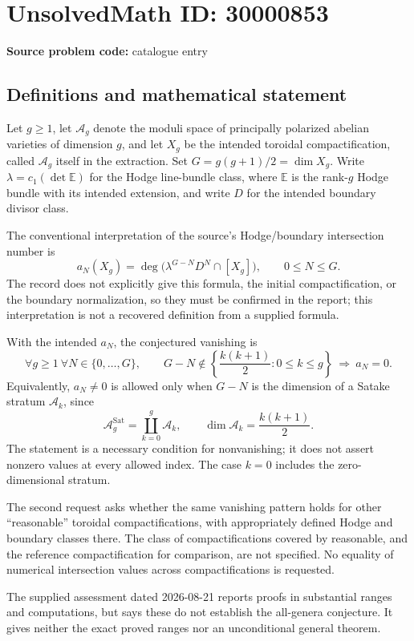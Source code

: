 \documentclass[11pt]{article}
\begin{document}
\section*{UnsolvedMath ID: 30000853}
\textbf{Source problem code:} catalogue entry
\subsection{Definitions and mathematical statement}
Let \(g\geq1\), let \(\mathcal A_g\) denote the moduli space of principally polarized abelian varieties of dimension \(g\), and let \(X_g\) be the intended toroidal compactification, called \(\mathcal A_g\) itself in the extraction. Set \(G=g(g+1)/2=\dim X_g\). Write \(\lambda=c_1(\det\mathbb E)\) for the Hodge line-bundle class, where \(\mathbb E\) is the rank-\(g\) Hodge bundle with its intended extension, and write \(D\) for the intended boundary divisor class.

The conventional interpretation of the source's Hodge/boundary intersection number is
\[
 a_N(X_g)=\deg\bigl(\lambda^{G-N}D^N\cap[X_g]\bigr),
 \qquad 0\leq N\leq G.
\]
The record does not explicitly give this formula, the initial compactification, or the boundary normalization, so they must be confirmed in the report; this interpretation is not a recovered definition from a supplied formula.

With the intended \(a_N\), the conjectured vanishing is
\[
 \forall g\geq1\ \forall N\in\{0,\ldots,G\},\qquad
 G-N\notin\left\{\frac{k(k+1)}2:0\leq k\leq g\right\}
 \ \Longrightarrow\ a_N=0.
\]
Equivalently, \(a_N\ne0\) is allowed only when \(G-N\) is the dimension of a Satake stratum \(\mathcal A_k\), since
\[
 \mathcal A_g^{\mathrm{Sat}}=\coprod_{k=0}^g\mathcal A_k,
 \qquad\dim\mathcal A_k=\frac{k(k+1)}2.
\]
The statement is a necessary condition for nonvanishing; it does not assert nonzero values at every allowed index. The case \(k=0\) includes the zero-dimensional stratum.

The second request asks whether the same vanishing pattern holds for other ``reasonable'' toroidal compactifications, with appropriately defined Hodge and boundary classes there. The class of compactifications covered by reasonable, and the reference compactification for comparison, are not specified. No equality of numerical intersection values across compactifications is requested.

The supplied assessment dated 2026-08-21 reports proofs in substantial ranges and computations, but says these do not establish the all-genera conjecture. It gives neither the exact proved ranges nor an unconditional general theorem.
\end{document}
